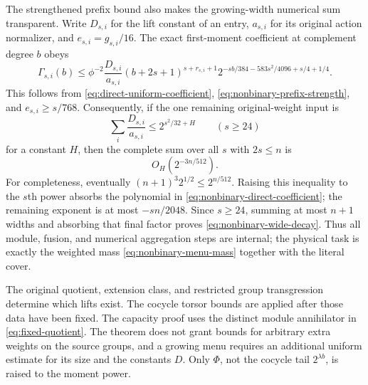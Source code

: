 The strengthened prefix bound also makes the growing-width numerical
sum transparent. Write $D_{s,i}$ for the lift constant of an entry,
$a_{s,i}$ for its original action normalizer, and $e_{s,i}=g_{s,i}/16$.
The exact first-moment coefficient at complement degree $b$ obeys
\begin{equation}\label{eq:nonbinary-direct-coefficient}
 \Gamma_{s,i}(b)\leq
 \phi^{-2}\frac{D_{s,i}}{a_{s,i}}
 (b+2s+1)^{s+r_{s,i}+1}
 2^{-sb/384-583s^2/4096+s/4+1/4}.
\end{equation}
This follows from \eqref{eq:direct-uniform-coefficient},
\eqref{eq:nonbinary-prefix-strength}, and $e_{s,i}\geq s/768$.
Consequently, if the one remaining original-weight input is
\begin{equation}\label{eq:nonbinary-menu-mass}
 \sum_i\frac{D_{s,i}}{a_{s,i}}
 \leq 2^{s^2/32+H}\qquad(s\geq24)
\end{equation}
for a constant $H$, then the complete sum over all $s$ with $2s\leq n$
is
\begin{equation}\label{eq:nonbinary-wide-decay}
 O_H\!\left(2^{-3n/512}\right).
\end{equation}
For completeness, eventually
$(n+1)^3 2^{1/2}\leq2^{n/512}$. Raising this inequality to the
$s$th power absorbs the polynomial in
\eqref{eq:nonbinary-direct-coefficient}; the remaining exponent is at
most $-sn/2048$. Since $s\geq24$, summing at most $n+1$ widths and
absorbing that final factor proves \eqref{eq:nonbinary-wide-decay}.
Thus all module, fusion, and numerical aggregation steps are internal;
the physical task is exactly the weighted mass
\eqref{eq:nonbinary-menu-mass} together with the literal cover.

\begin{remark}
The original quotient, extension class, and restricted group
transgression determine which lifts exist. The cocycle torsor bounds
are applied after those data have been fixed. The capacity proof uses
the distinct module annihilator in \eqref{eq:fixed-quotient}.
The theorem does not grant bounds for arbitrary extra weights on the
source groups, and a growing menu requires an additional uniform
estimate for its size and the constants $D$. Only $\Phi$, not the
cocycle tail $2^{\lambda b}$, is raised to the moment power.
\end{remark}
